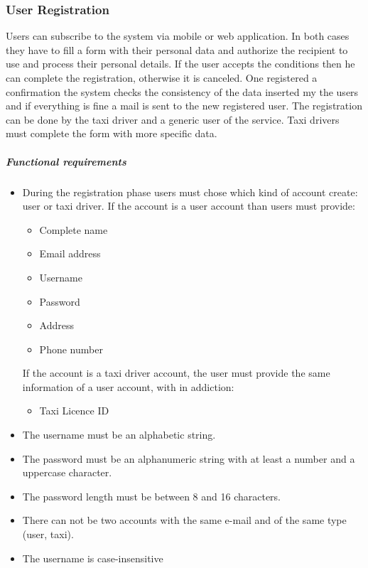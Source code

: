 \subsubsection{User Registration}
    Users can subscribe to the system via mobile or web application. In both cases they have to fill a form with their personal data and authorize the recipient to use and process their personal details.
    If the user accepts the conditions then he can complete the registration, otherwise it is canceled.
    One registered a confirmation the system checks the consistency of the data inserted my the users and if everything is fine a mail is sent to the new registered user.
    The registration can be done by the taxi driver and a generic user of the service. Taxi drivers must complete the form with more specific data.
    
    \subparagraph{Functional requirements}
    \begin{itemize}
        \item  During the registration phase users must chose which kind of account create: user or taxi driver.
            If the account is a user account than users must provide:
            \begin{itemize}
                \item Complete name
                \item Email address
                \item Username
                \item Password
                \item Address
                \item Phone number
            \end{itemize}
            If the account is a taxi driver account, the user must provide the same information of a user account, with in addiction:
            \begin{itemize}
                \item Taxi Licence ID
            \end{itemize}
        \item The username must be an alphabetic string.
        \item The password must be an alphanumeric string with at least a number and a uppercase character.
        \item The password length must be between 8 and 16 characters.
        \item There can not be two accounts with the same e-mail and of the same type (user, taxi).
        \item The username is case-insensitive
    \end{itemize}
    
